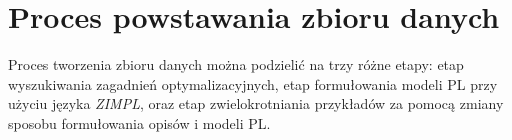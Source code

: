 \section{Proces powstawania zbioru danych}

Proces tworzenia zbioru danych można podzielić na trzy różne etapy: etap wyszukiwania zagadnień optymalizacyjnych, etap formułowania modeli PL przy użyciu języka \textit{ZIMPL}, oraz etap zwielokrotniania przykładów za pomocą zmiany sposobu formułowania opisów i modeli PL. %


